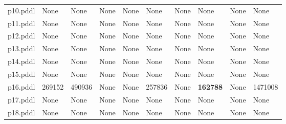 \documentclass{article}
\begin{document}
\begin{tabular}{@{}lrrrrrrrrr@{}}
p10.pddl & \multicolumn{1}{|l|}{None} & \multicolumn{1}{|l|}{None} & \multicolumn{1}{|l|}{None} & \multicolumn{1}{|l|}{None} & \multicolumn{1}{|l|}{None} & \multicolumn{1}{|l|}{None} & \multicolumn{1}{|l|}{None} & \multicolumn{1}{|l|}{None} & \multicolumn{1}{|l|}{None} \\
p11.pddl & \multicolumn{1}{|l|}{None} & \multicolumn{1}{|l|}{None} & \multicolumn{1}{|l|}{None} & \multicolumn{1}{|l|}{None} & \multicolumn{1}{|l|}{None} & \multicolumn{1}{|l|}{None} & \multicolumn{1}{|l|}{None} & \multicolumn{1}{|l|}{None} & \multicolumn{1}{|l|}{None} \\
p12.pddl & \multicolumn{1}{|l|}{None} & \multicolumn{1}{|l|}{None} & \multicolumn{1}{|l|}{None} & \multicolumn{1}{|l|}{None} & \multicolumn{1}{|l|}{None} & \multicolumn{1}{|l|}{None} & \multicolumn{1}{|l|}{None} & \multicolumn{1}{|l|}{None} & \multicolumn{1}{|l|}{None} \\
p13.pddl & \multicolumn{1}{|l|}{None} & \multicolumn{1}{|l|}{None} & \multicolumn{1}{|l|}{None} & \multicolumn{1}{|l|}{None} & \multicolumn{1}{|l|}{None} & \multicolumn{1}{|l|}{None} & \multicolumn{1}{|l|}{None} & \multicolumn{1}{|l|}{None} & \multicolumn{1}{|l|}{None} \\
p14.pddl & \multicolumn{1}{|l|}{None} & \multicolumn{1}{|l|}{None} & \multicolumn{1}{|l|}{None} & \multicolumn{1}{|l|}{None} & \multicolumn{1}{|l|}{None} & \multicolumn{1}{|l|}{None} & \multicolumn{1}{|l|}{None} & \multicolumn{1}{|l|}{None} & \multicolumn{1}{|l|}{None} \\
p15.pddl & \multicolumn{1}{|l|}{None} & \multicolumn{1}{|l|}{None} & \multicolumn{1}{|l|}{None} & \multicolumn{1}{|l|}{None} & \multicolumn{1}{|l|}{None} & \multicolumn{1}{|l|}{None} & \multicolumn{1}{|l|}{None} & \multicolumn{1}{|l|}{None} & \multicolumn{1}{|l|}{None} \\
p16.pddl & 269152 & 490936 & \multicolumn{1}{|l|}{None} & \multicolumn{1}{|l|}{None} & 257836 & \multicolumn{1}{|l|}{None} & \textbf{162788} & \multicolumn{1}{|l|}{None} & 1471008 \\
p17.pddl & \multicolumn{1}{|l|}{None} & \multicolumn{1}{|l|}{None} & \multicolumn{1}{|l|}{None} & \multicolumn{1}{|l|}{None} & \multicolumn{1}{|l|}{None} & \multicolumn{1}{|l|}{None} & \multicolumn{1}{|l|}{None} & \multicolumn{1}{|l|}{None} & \multicolumn{1}{|l|}{None} \\
p18.pddl & \multicolumn{1}{|l|}{None} & \multicolumn{1}{|l|}{None} & \multicolumn{1}{|l|}{None} & \multicolumn{1}{|l|}{None} & \multicolumn{1}{|l|}{None} & \multicolumn{1}{|l|}{None} & \multicolumn{1}{|l|}{None} & \multicolumn{1}{|l|}{None} & \multicolumn{1}{|l|}{None} \\

\end{tabular}
\end{document}

